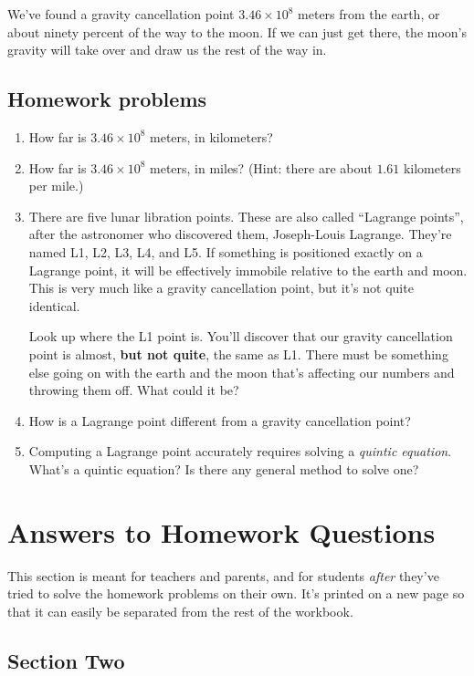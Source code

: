 \documentclass[12pt,letterpaper]{article}
\begin{document}
We've found a gravity cancellation point $3.46 \times 10^8$ meters from the
  earth, or about ninety percent of the way to the moon.  If we can
  just get there, the moon's gravity will take over and draw us the
  rest of the way in.

  \subsection{Homework problems}
  \begin{enumerate}
  \item
    How far is $3.46 \times 10^8$ meters, in kilometers?
  \item
    How far is $3.46 \times 10^8$ meters, in miles?  (Hint: there are
    about $1.61$ kilometers per mile.)
  \item
    There are five lunar libration points.  These are also called
    ``Lagrange points'', after the astronomer who discovered them,
    Joseph-Louis Lagrange.  They're named L1, L2, L3, L4, and L5.  If
    something is positioned exactly on a Lagrange point, it will be
    effectively immobile relative to the earth and moon.  This is very
    much like a gravity cancellation point, but it's not quite identical.

    Look up where the L1 point is.  You'll discover that our gravity
    cancellation point is almost, \textbf{but not quite}, the same as
    L1.
    There must be something
    else going on with the earth and the moon that's affecting our
    numbers and throwing them off.  What could it be?
  \item
    How is a Lagrange point different from a gravity cancellation
    point?
  \item
    Computing a Lagrange point accurately requires solving a
    \textit{quintic equation}.  What's a quintic equation?  Is there
    any general method to solve one?
  \end{enumerate}

  \newpage
  \section{Answers to Homework Questions}

  This section is meant for teachers and parents, and for students
  \textit{after} they've tried to solve the homework problems on their
  own.  It's printed on a new page so that it can easily be separated
  from the rest of the workbook.
  
  \subsection{Section Two}
\end{document}
